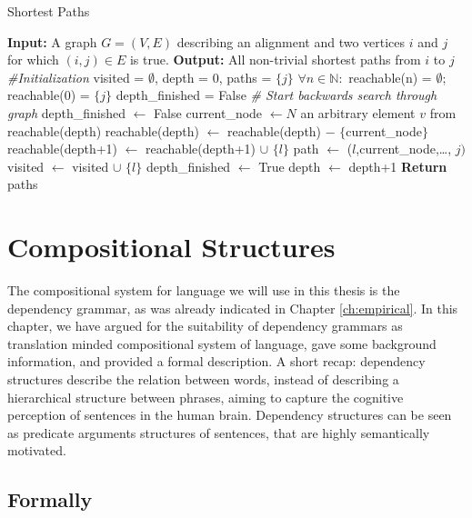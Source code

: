 \documentclass{report}
\theoremstyle{break}
\begin{document}
\begin{algorithm}[!ht]
\caption{Shortest Paths}\label{alg:shortest paths}
\begin{algorithmic}
\STATE \textbf{Input:} A graph $G = (V,E)$ describing an alignment and two vertices $i$ and $j$ for which $(i,j)\in E$ is true.
\STATE \textbf{Output:} All non-trivial shortest paths from $i$ to $j$
\STATE \textit{\#Initialization}
\STATE visited = $\emptyset$, depth = $0$, paths = $\{j\}$
\STATE $\forall n\in\mathbb{N}:$ reachable(n) = $\emptyset$; reachable($0$) = $\{j\}$
\STATE depth\_finished = False
\STATE \textit{\# Start backwards search through graph}
		\STATE depth\_finished $\leftarrow$ False
		\STATE current\_node $\leftarrow N$ an arbitrary element $v$ from reachable(depth)
		\STATE reachable(depth) $\leftarrow$ reachable(depth) $-$ $\{$current\_node$\}$
				\STATE reachable(depth+1) $\leftarrow$ reachable(depth+1) $\cup$ $\{l\}$
					\STATE path $\leftarrow$ ($l$,current\_node,\ldots, $j)$
				\ENDFOR
			\ENDIF
		\STATE visited $\leftarrow$ visited $\cup$ $\{l\}$
		\ENDFOR
	\STATE depth\_finished $\leftarrow$ True
	\STATE depth $\leftarrow$ depth+1
	\ENDWHILE
\ENDWHILE
\STATE \textbf{Return} paths
\end{algorithmic}
\end{algorithm}


\section{Compositional Structures}

The compositional system for language we will use in this thesis is the dependency grammar, as was already indicated in Chapter \ref{ch:empirical}. In this chapter, we have argued for the suitability of dependency grammars as translation minded compositional system of language, gave some background information, and provided a formal description. A short recap: dependency structures describe the relation between words, instead of describing a hierarchical structure between phrases, aiming to capture the cognitive perception of sentences in the human brain. Dependency structures can be seen as predicate arguments structures of sentences, that are highly semantically motivated.

\subsection{Formally}
\end{document}

